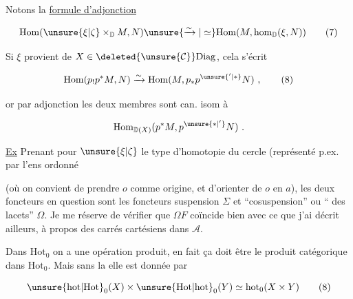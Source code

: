 Notons la \uline{formule d'adjonction}

\[\mathrm{Hom}(\unsure{\xi|\zeta}\times_{\mathbb D}M,N)\unsure{\xrightarrow{\sim}|\simeq}
\mathrm{Hom}(M,\mathrm{hom}_{\mathbb D}(\xi,N))\tag*{(7)}\]

Si $\xi$ provient  de $X\in\deleted{\unsure{\mathcal C}}\mathrm{Diag}$,  cela s'écrit

\[\mathrm{Hom}(p_!p^*M,N)\xrightarrow{\sim}\mathrm{Hom}(M,p_*p^{\unsure{'|*}}N)\ ,\tag*{(8)}\]


or par adjonction les deux membres sont can. isom à

\[\mathrm{Hom}_{\mathbb D(X)}(p^*M,p^{\unsure{*|'}}N)\ .\]

 \uline{Ex} Prenant pour $\unsure{\xi|\zeta}$ le type d'homotopie du cercle  (représenté p.ex. par l'ens ordonné


(où on convient de prendre $o$ comme origine, et d'orienter de $o$ en $a$), les deux foncteurs en question sont  les foncteurs suspension $\Sigma$ et ``cosuspension'' ou ``  des lacets'' $\Omega$. Je me réserve de vérifier que $\Omega F$ coïncide bien avec ce que j'ai décrit ailleurs, à propos des carrés  cartésiens dans $\mathcal A$.

Dans $\mathrm{Hot}_0$ on a une opération produit, en fait ça doit être le produit catégorique dans $\mathrm{Hot}_0$. Mais sans la  elle est donnée par

\[\unsure{\mathrm{hot}|\mathrm{Hot}}_0(X)\times\unsure{\mathrm{Hot}|\mathrm{hot}}_0(Y)\simeq\mathrm{hot}_0(X\times Y)\tag*{(8)}\]

